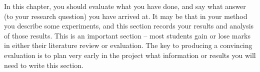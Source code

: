In this chapter, you should evaluate what you have done, and say what answer (to your research question) you have arrived at. It may be that in your method you describe some experiments, and this section records your results and analysis of those results. This is an important section -- most students gain or lose marks in either their literature review or evaluation. The key to producing a convincing evaluation is to plan very early in the project what information or results you will need to write this section.